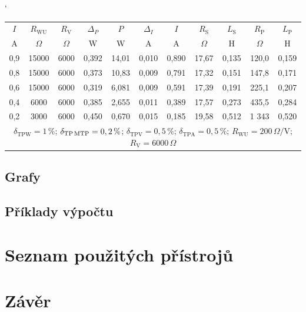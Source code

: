 \documentclass[a4paper, czech]{article}
\begin{document}
\begin{table}[H]
    \catcode`
    \centering
    \begin{tabular}{ccccccccccc}
        \toprule
        $I$   & $R_\text{WU}$   & $R_\text{V}$   & $\Delta_P$    & $P$     & $\Delta_I$    & $I$     & $R_\text{S}$    & $L_\text{S}$    & $R_\text{P}$    & $L_\text{P}$    \\
        \cmidrule(rl){1-1}
        \cmidrule(rl){2-2}
        \cmidrule(rl){3-3}
        \cmidrule(rl){4-4}
        \cmidrule(rl){5-5}
        \cmidrule(rl){6-6}
        \cmidrule(rl){7-7}
        \cmidrule(rl){8-8}
        \cmidrule(rl){9-9}
        \cmidrule(rl){10-10}
        \cmidrule(rl){11-11}
        A   & $\Omega$     & $\Omega$    & W     & W     & A     & A     & $\Omega$     & H     & $\Omega$     & H     \\
        \midrule
        0,9 & 15000 & 6000 & 0,392 & 14,01 & 0,010 & 0,890 & 17,67 & 0,135 & 120,0 & 0,159 \\
        0,8 & 15000 & 6000 & 0,373 & 10,83 & 0,009 & 0,791 & 17,32 & 0,151 & 147,8 & 0,171 \\
        0,6 & 15000 & 6000 & 0,319 & 6,081 & 0,009 & 0,591 & 17,39 & 0,191 & 225,1 & 0,207 \\
        0,4 & 6000  & 6000 & 0,385 & 2,655 & 0,011 & 0,389 & 17,57 & 0,273 & 435,5 & 0,284 \\
        0,2 & 3000  & 6000 & 0,450 & 0,670 & 0,015 & 0,185 & 19,58 & 0,512 & 1 343 & 0,520 \\
        \bottomrule
        \multicolumn{11}{c}{$\delta_\text{TPW} = 1\,\%$; $\delta_\text{TP\,MTP} = 0,2\,\%$; $\delta_\text{TPV} = 0,5\,\%$; $\delta_\text{TPA} = 0,5\,\%$; $R_\text{WU} = 200\,\Omega/\text{V}$; $R_\text{V} = 6000\,\Omega$}
    \end{tabular}
\end{table}

\subsection{Grafy}

\subsection{Příklady výpočtu}

\section{Seznam použitých přístrojů}

\section{Závěr}
\end{document}
